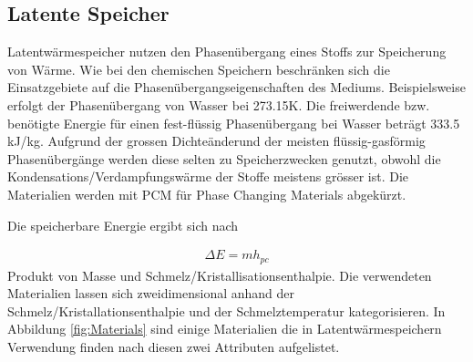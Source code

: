 \documentclass[11pt,a4paper]{scrartcl}
\begin{document}
\subsection{Latente Speicher}
Latentwärmespeicher nutzen den Phasenübergang eines Stoffs zur Speicherung von
Wärme. Wie bei den chemischen Speichern beschränken sich die Einsatzgebiete auf
die Phasenübergangseigenschaften des Mediums. Beispielsweise erfolgt der
Phasenübergang von Wasser bei 273.15K. Die freiwerdende bzw. benötigte Energie
für einen fest-flüssig Phasenübergang bei Wasser beträgt 333.5 kJ/kg.
Aufgrund der grossen Dichteänderund der meisten flüssig-gasförmig
Phasenübergänge werden diese selten zu Speicherzwecken genutzt, obwohl die
Kondensations/Verdampfungswärme der Stoffe meistens grösser ist. Die Materialien
werden mit PCM für \flqq Phase Changing Materials\frqq{} abgekürzt.

Die speicherbare Energie ergibt sich nach

\begin{align}
\Delta E = mh_{pc}
\end{align}
Produkt von Masse und Schmelz/Kristallisationsenthalpie. Die verwendeten
Materialien lassen sich zweidimensional anhand der
Schmelz/Kristallationsenthalpie und der Schmelztemperatur kategorisieren. In
Abbildung \ref{fig:Materials} sind einige Materialien die in
Latentwärmespeichern Verwendung finden nach diesen zwei Attributen aufgelistet.
\end{document}
